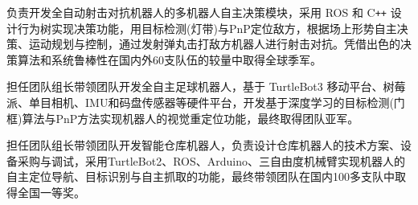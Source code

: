 \documentclass{resume}
\begin{document}
\begin{onehalfspacing}
负责开发全自动射击对抗机器人的多机器人自主决策模块，采用 ROS 和 C\texttt{++} 设计行为树实现决策功能，用目标检测(灯带)与PnP定位敌方，根据场上形势自主决策、运动规划与控制，通过发射弹丸击打敌方机器人进行射击对抗。凭借出色的决策算法和系统鲁棒性在国内外60支队伍的较量中取得全球季军。
\end{onehalfspacing}
\begin{onehalfspacing}
担任团队组长带领团队开发全自主足球机器人，基于 TurtleBot3 移动平台、树莓派、单目相机、IMU和码盘传感器等硬件平台，开发基于深度学习的目标检测(门框)算法与PnP方法实现机器人的视觉重定位功能，最终取得团队亚军。
\end{onehalfspacing}
\begin{onehalfspacing}
担任团队组长带领团队开发智能仓库机器人，负责设计仓库机器人的技术方案、设备采购与调试，采用TurtleBot2、ROS、Arduino、三自由度机械臂实现机器人的自主定位导航、目标识别与自主抓取的功能，最终带领团队在国内100多支队中取得全国一等奖。
\end{onehalfspacing}
\end{document}
